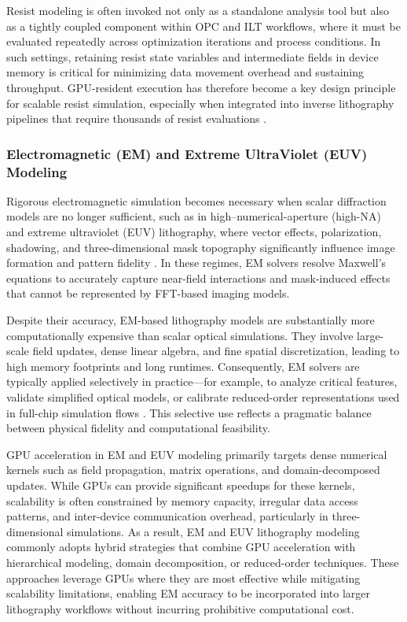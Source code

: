 \documentclass[pdflatex,sn-mathphys-num]{sn-jnl}%
\theoremstyle{thmstyleone}%
\theoremstyle{thmstyletwo}%
\theoremstyle{thmstylethree}%
\begin{document}
Resist modeling is often invoked not only as a standalone analysis tool but also as a tightly coupled component within OPC and ILT workflows, where it must be evaluated repeatedly across optimization iterations and process conditions. In such settings, retaining resist state variables and intermediate fields in device memory is critical for minimizing data movement overhead and sustaining throughput. GPU-resident execution has therefore become a key design principle for scalable resist simulation, especially when integrated into inverse lithography pipelines that require thousands of resist evaluations \cite{Zheng2023}.

\subsubsection{Electromagnetic (EM) and Extreme UltraViolet (EUV) Modeling}
Rigorous electromagnetic simulation becomes necessary when scalar diffraction models are no longer sufficient, such as in high–numerical-aperture (high-NA) and extreme ultraviolet (EUV) lithography, where vector effects, polarization, shadowing, and three-dimensional mask topography significantly influence image formation and pattern fidelity \cite{Wong2001ResolutionET,2017JMM&M}. In these regimes, EM solvers resolve Maxwell’s equations to accurately capture near-field interactions and mask-induced effects that cannot be represented by FFT-based imaging models.

Despite their accuracy, EM-based lithography models are substantially more computationally expensive than scalar optical simulations. They involve large-scale field updates, dense linear algebra, and fine spatial discretization, leading to high memory footprints and long runtimes. Consequently, EM solvers are typically applied selectively in practice—for example, to analyze critical features, validate simplified optical models, or calibrate reduced-order representations used in full-chip simulation flows \cite{shamoun2021multi}. This selective use reflects a pragmatic balance between physical fidelity and computational feasibility.

GPU acceleration in EM and EUV modeling primarily targets dense numerical kernels such as field propagation, matrix operations, and domain-decomposed updates. While GPUs can provide significant speedups for these kernels, scalability is often constrained by memory capacity, irregular data access patterns, and inter-device communication overhead, particularly in three-dimensional simulations. As a result, EM and EUV lithography modeling commonly adopts hybrid strategies that combine GPU acceleration with hierarchical modeling, domain decomposition, or reduced-order techniques. These approaches leverage GPUs where they are most effective while mitigating scalability limitations, enabling EM accuracy to be incorporated into larger lithography workflows without incurring prohibitive computational cost.
\end{document}
